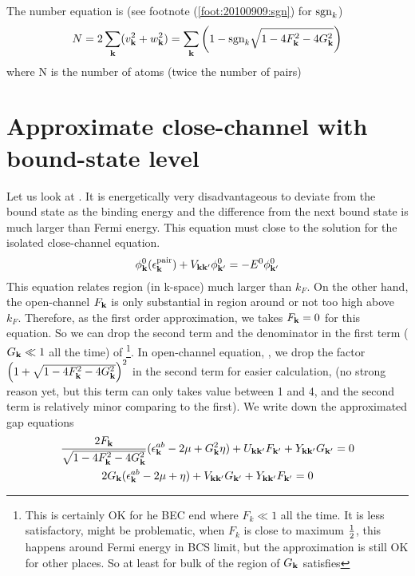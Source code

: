 The number equation is (see footnote (\ref{foot:20100909:sgn}) for $\text{sgn}_{k}$)
\begin{equation}\label{eq:20100909:number}
N=2\sum_{\mathbf{k}}(v_{\mathbf{k}}^{2}+w_{\mathbf{k}}^{2})=\sum_{\mathbf{k}}\left(1-\text{sgn}_{k}\sqrt{1-4 F_{\mathbf{k}}^2-4 G_{\mathbf{k}}^2}\right)
\end{equation} 
where N is the number of atoms (twice  the number of pairs)

\section{Approximate close-channel with bound-state level}
Let us look at .  It is energetically very disadvantageous to deviate from the bound state as the binding energy and the difference from the next bound state is much  larger than Fermi energy.     This equation must close to  the solution for the isolated close-channel \sch equation.  
\begin{equation}\label{eq:20100915:twobody}
{\phi^{0}_{\ensuremath{\mathbf{k}}}}(\epsilon^{\text{pair}}_{\mathbf{k}})+V_{\mathbf{k}\mathbf{k}'}\phi^{0}_{\mathbf{k}'}=-E^{0}\phi^{0}_{\mathbf{k}'}
\end{equation}
This equation relates region (in k-space) much larger than $k_{F}$.  On the other hand, the open-channel 
$F_{\mathbf{k}}$ is only substantial in region around or not too high above  $k_{F}$.  Therefore, as the first order approximation, we takes $F_{\mathbf{k}}=0$ for this equation. So we can drop the second term and the denominator in the first term ($G_{\mathbf{k}}\ll1$ all the time) of \footnote{ This is certainly OK for he BEC end where $F_{k}\ll1$ all the time.  It is less satisfactory, might be problematic,  when $F_{k}$ is close to maximum $\frac{1}{2}$, this happens around Fermi energy in BCS limit, but the approximation is still OK for other places. So at least for bulk of the region of $G_{\mathbf{k}}$ satisfies }.  In  open-channel equation, , we drop the factor $\left(1+\sqrt{1-4 F_{\mathbf{k}}^2-4 G_{\mathbf{k}}^2}\right)^2$ in the second term for easier calculation, (no strong reason yet, but this term can only takes value between 1 and 4, and the second term is relatively minor comparing to the first). We write down the approximated gap equations
\begin{subequations}\label{eq:20100915:gap}
\begin{gather}\label{eq:20100915:gapa}
\frac{2F_{\mathbf{k}}}{\sqrt{1-4 F_{\mathbf{k}}^2-4 G_{\mathbf{k}}^2}} (\epsilon^{ab}_{\mathbf{k}}-2\mu+  G_{\mathbf{k}}^2\eta)+U_{\mathbf{k}\mathbf{k}'}F_{\mathbf{k}'}+Y_{\mathbf{k}\mathbf{k}'}G_{\mathbf{k}'}=0\\
\label{eq:20100915:gapb}
{2G_{\ensuremath{\mathbf{k}}}}(\epsilon^{ab}_{\mathbf{k}}-2\mu+\eta)+V_{\mathbf{k}\mathbf{k}'}G_{\mathbf{k}'}+Y_{\mathbf{k}\mathbf{k}'}F_{\mathbf{k}'}=0
\end{gather}
\end{subequations}
